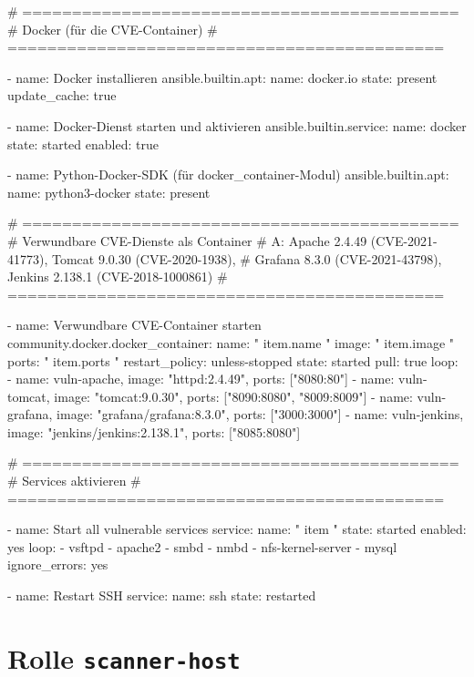 \begin{GenericCode}
# ============================================
# Docker (für die CVE-Container)
# ============================================

- name: Docker installieren
  ansible.builtin.apt:
    name: docker.io
    state: present
    update_cache: true

- name: Docker-Dienst starten und aktivieren
  ansible.builtin.service:
    name: docker
    state: started
    enabled: true

- name: Python-Docker-SDK (für docker_container-Modul)
  ansible.builtin.apt:
    name: python3-docker
    state: present

# ============================================
# Verwundbare CVE-Dienste als Container
# A: Apache 2.4.49 (CVE-2021-41773), Tomcat 9.0.30 (CVE-2020-1938),
#    Grafana 8.3.0 (CVE-2021-43798), Jenkins 2.138.1 (CVE-2018-1000861)
# ============================================

- name: Verwundbare CVE-Container starten
  community.docker.docker_container:
    name: "{{ item.name }}"
    image: "{{ item.image }}"
    ports: "{{ item.ports }}"
    restart_policy: unless-stopped
    state: started
    pull: true
  loop:
    - { name: vuln-apache,  image: "httpd:2.4.49",            ports: ["8080:80"] }
    - { name: vuln-tomcat,  image: "tomcat:9.0.30",           ports: ["8090:8080", "8009:8009"] }
    - { name: vuln-grafana, image: "grafana/grafana:8.3.0",   ports: ["3000:3000"] }
    - { name: vuln-jenkins, image: "jenkins/jenkins:2.138.1", ports: ["8085:8080"] }

# ============================================
# Services aktivieren
# ============================================

- name: Start all vulnerable services
  service:
    name: "{{ item }}"
    state: started
    enabled: yes
  loop:
    - vsftpd
    - apache2
    - smbd
    - nmbd
    - nfs-kernel-server
    - mysql
  ignore_errors: yes

- name: Restart SSH
  service:
    name: ssh
    state: restarted
\end{GenericCode}

\section{Rolle \texttt{scanner-host}}

